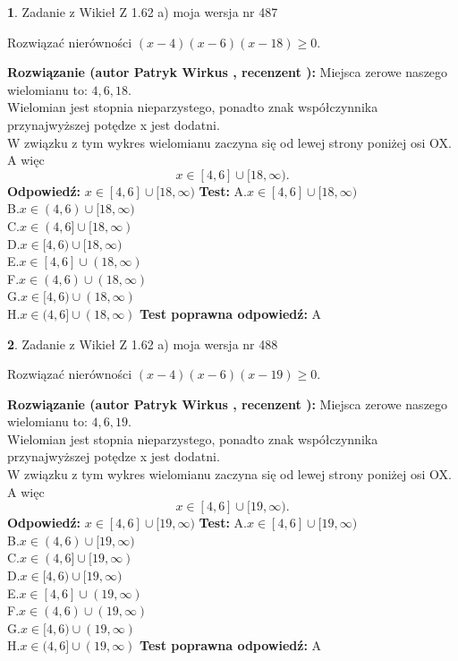 \documentclass[12pt, a4paper]{article}
\theoremstyle{definition} %
\newtheorem{zad}{}
\newcommand{\zadStart}[1]{\begin{zad}#1\newline}
\newcommand{\zadStop}{\end{zad}}
\newcommand{\rozwStart}[2]{\noindent \textbf{Rozwiązanie (autor #1 , recenzent #2): }\newline}
\newcommand{\rozwStop}{\newline}
\newcommand{\odpStart}{\noindent \textbf{Odpowiedź:}\newline}
\newcommand{\odpStop}{\newline}
\newcommand{\testStart}{\noindent \textbf{Test:}\newline}
\newcommand{\testStop}{\newline}
\newcommand{\kluczStart}{\noindent \textbf{Test poprawna odpowiedź:}\newline}
\newcommand{\kluczStop}{\newline}
\begin{document}
\zadStart{Zadanie z Wikieł Z 1.62 a) moja wersja nr 487}

Rozwiązać nierówności $(x-4)(x-6)(x-18)\ge0$.
\zadStop
\rozwStart{Patryk Wirkus}{}
Miejsca zerowe naszego wielomianu to: $4, 6, 18$.\\
Wielomian jest stopnia nieparzystego, ponadto znak współczynnika przy\linebreak najwyższej potędze x jest dodatni.\\ W związku z tym wykres wielomianu zaczyna się od lewej strony poniżej osi OX. A więc $$x \in [4,6] \cup [18,\infty).$$
\rozwStop
\odpStart
$x \in [4,6] \cup [18,\infty)$
\odpStop
\testStart
A.$x \in [4,6] \cup [18,\infty)$\\
B.$x \in (4,6) \cup [18,\infty)$\\
C.$x \in (4,6] \cup [18,\infty)$\\
D.$x \in [4,6) \cup [18,\infty)$\\
E.$x \in [4,6] \cup (18,\infty)$\\
F.$x \in (4,6) \cup (18,\infty)$\\
G.$x \in [4,6) \cup (18,\infty)$\\
H.$x \in (4,6] \cup (18,\infty)$
\testStop
\kluczStart
A
\kluczStop



\zadStart{Zadanie z Wikieł Z 1.62 a) moja wersja nr 488}

Rozwiązać nierówności $(x-4)(x-6)(x-19)\ge0$.
\zadStop
\rozwStart{Patryk Wirkus}{}
Miejsca zerowe naszego wielomianu to: $4, 6, 19$.\\
Wielomian jest stopnia nieparzystego, ponadto znak współczynnika przy\linebreak najwyższej potędze x jest dodatni.\\ W związku z tym wykres wielomianu zaczyna się od lewej strony poniżej osi OX. A więc $$x \in [4,6] \cup [19,\infty).$$
\rozwStop
\odpStart
$x \in [4,6] \cup [19,\infty)$
\odpStop
\testStart
A.$x \in [4,6] \cup [19,\infty)$\\
B.$x \in (4,6) \cup [19,\infty)$\\
C.$x \in (4,6] \cup [19,\infty)$\\
D.$x \in [4,6) \cup [19,\infty)$\\
E.$x \in [4,6] \cup (19,\infty)$\\
F.$x \in (4,6) \cup (19,\infty)$\\
G.$x \in [4,6) \cup (19,\infty)$\\
H.$x \in (4,6] \cup (19,\infty)$
\testStop
\kluczStart
A
\kluczStop
\end{document}
